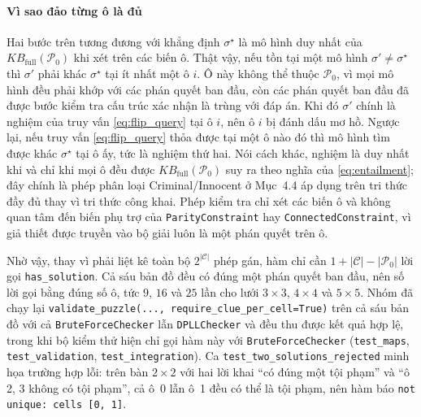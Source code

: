 \begin{sloppypar}
\paragraph{Vì sao đảo từng ô là đủ}
Hai bước trên tương đương với khẳng định $\sigma^\star$ là mô hình duy nhất của
$\mathit{KB}_{\mathrm{full}}(\mathcal{P}_0)$ khi xét trên các biến ô. Thật vậy,
nếu tồn tại một mô hình $\sigma' \ne \sigma^\star$ thì $\sigma'$ phải khác
$\sigma^\star$ tại ít nhất một ô $i$. Ô này không thể thuộc $\mathcal{P}_0$, vì
mọi mô hình đều phải khớp với các phán quyết ban đầu, còn các phán quyết ban đầu
đã được bước kiểm tra cấu trúc xác nhận là trùng với đáp án. Khi đó $\sigma'$
chính là nghiệm của truy vấn \eqref{eq:flip_query} tại ô $i$, nên ô $i$ bị đánh
dấu mơ hồ. Ngược lại, nếu truy vấn \eqref{eq:flip_query} thỏa được tại một ô
nào đó thì mô hình tìm được khác $\sigma^\star$ tại ô ấy, tức là nghiệm thứ hai.
Nói cách khác, nghiệm là duy nhất khi và chỉ khi mọi ô đều được
$\mathit{KB}_{\mathrm{full}}(\mathcal{P}_0)$ suy ra theo nghĩa của
\eqref{eq:entailment}; đây chính là phép phân loại Criminal/Innocent ở Mục~4.4
áp dụng trên tri thức đầy đủ thay vì tri thức công khai. Phép kiểm tra chỉ xét
các biến ô và không quan tâm đến biến phụ trợ của \texttt{ParityConstraint} hay
\texttt{ConnectedConstraint}, vì giả thiết được truyền vào bộ giải luôn là một
phán quyết trên ô.

Nhờ vậy, thay vì phải liệt kê toàn bộ $2^{|\mathcal{C}|}$ phép gán, hàm chỉ cần
$1 + |\mathcal{C}| - |\mathcal{P}_0|$ lời gọi \texttt{has\_solution}. Cả sáu bản
đồ đều có đúng một phán quyết ban đầu, nên số lời gọi bằng đúng số ô, tức $9$,
$16$ và $25$ lần cho lưới $3\times3$, $4\times4$ và $5\times5$. Nhóm đã chạy lại
\texttt{validate\_puzzle(..., require\_clue\_per\_cell=True)} trên cả sáu bản
đồ với cả \texttt{BruteForceChecker} lẫn \texttt{DPLLChecker} và đều thu được kết
quả hợp lệ, trong khi bộ kiểm thử hiện chỉ gọi hàm này với
\texttt{BruteForceChecker} (\texttt{test\_maps}, \texttt{test\_validation},
\texttt{test\_integration}). Ca \texttt{test\_two\_solutions\_rejected} minh họa
trường hợp lỗi: trên bàn $2\times2$ với hai lời khai ``có đúng một tội phạm'' và
``ô 2, 3 không có tội phạm'', cả ô~0 lẫn ô~1 đều có thể là tội phạm, nên hàm báo
\texttt{not unique: cells [0, 1]}.


\end{sloppypar}
